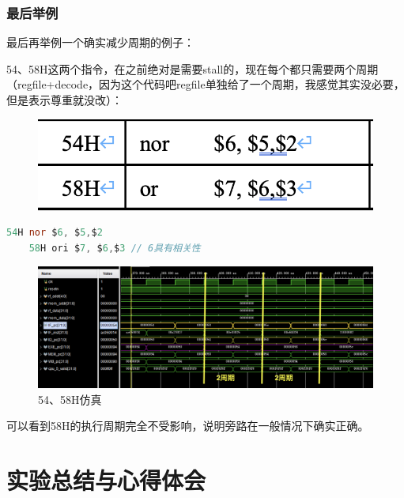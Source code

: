 \documentclass[a4paper]{article}
\begin{document}
\subsubsection{最后举例}

最后再举例一个确实减少周期的例子：

54、58H这两个指令，在之前绝对是需要stall的，现在每个都只需要两个周期（regfile+decode，因为这个代码吧regfile单独给了一个周期，我感觉其实没必要，但是表示尊重就没改）：


\begin{figure}[H]
    \centering
    \includegraphics[width=0.5\linewidth]{img/顺序图片/5458H.png}
\end{figure}

\begin{lstlisting}[language=Verilog]
    54H nor $6, $5,$2 
    58H ori $7, $6,$3 // 6具有相关性
\end{lstlisting}


\begin{figure}[H]
    \centering
    \includegraphics[width=\linewidth]{img/顺序图片/5458.png}
    \caption{54、58H仿真}
\end{figure}

可以看到58H的执行周期完全不受影响，说明旁路在一般情况下确实正确。

\newpage
\section{实验总结与心得体会}
\end{document}

